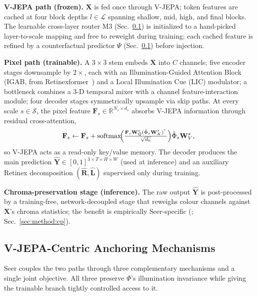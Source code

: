 \noindent\textbf{V-JEPA path (frozen).} $\mathbf{X}$ is fed once through V-JEPA; token features are cached at four block depths $l\!\in\!\mathcal{L}$ spanning shallow, mid, high, and final blocks. The learnable cross-layer router M3 (Sec.~\ref{sec:method:mechanisms}) is initialized to a hand-picked layer-to-scale mapping and free to reweight during training; each cached feature is refined by a counterfactual predictor $\Psi$ (Sec.~\ref{sec:method:mechanisms}) before injection.

\noindent\textbf{Pixel path (trainable).} A $3{\times}3$ stem embeds $\mathbf{X}$ into $C$ channels; five encoder stages downsample by $2{\times}$, each with an Illumination-Guided Attention Block (IGAB, from Retinexformer~\citep{retinexformer}) and a Local Illumination Cue (LIC) modulator; a bottleneck combines a 3-D temporal mixer with a channel feature-interaction module; four decoder stages symmetrically upsample via skip paths. At every scale $s\in\mathcal{S}$, the pixel feature $\mathbf{F}_{s}\in\mathbb{R}^{N_{s}\times d_{s}}$ absorbs V-JEPA information through residual cross-attention,
\begin{equation}\label{eq:xattn}
\mathbf{F}_{s} \leftarrow \mathbf{F}_{s} + \operatorname{softmax}\!\Bigl(\tfrac{\mathbf{F}_{s}\mathbf{W}_{Q}^{s}(\tilde{\Phi}_{s}\mathbf{W}_{K}^{s})^{\!\top}}{\sqrt{d_{h}}}\Bigr)\tilde{\Phi}_{s}\mathbf{W}_{V}^{s},
\end{equation}
so V-JEPA acts as a read-only key/value memory. The decoder produces the main prediction $\hat{\mathbf{Y}}\!\in\![0,1]^{3\times T\times H\times W}$ (used at inference) and an auxiliary Retinex decomposition $(\hat{\mathbf{R}},\hat{\mathbf{L}})$ supervised only during training.

\noindent\textbf{Chroma-preservation stage (inference).} The raw output $\hat{\mathbf{Y}}$ is post-processed by a training-free, network-decoupled stage that reweighs colour channels against $\mathbf{X}$'s chroma statistics; the benefit is empirically Seer-specific (; Sec.~\ref{sec:method:cp}).

\subsection{V-JEPA-Centric Anchoring Mechanisms}\label{sec:method:mechanisms}
Seer couples the two paths through three complementary mechanisms and a single joint objective. All three preserve $\Phi$'s illumination invariance while giving the trainable branch tightly controlled access to it.

